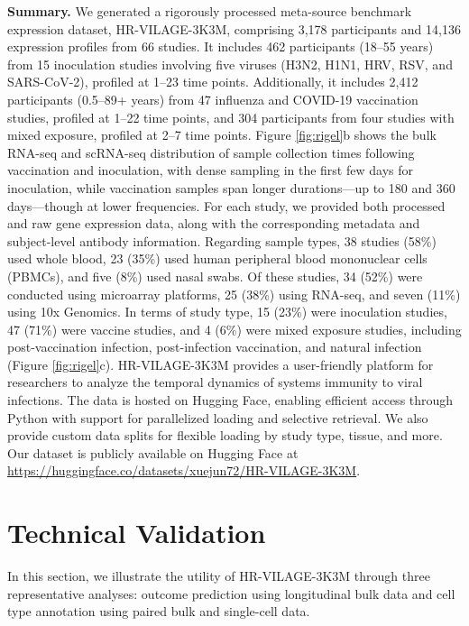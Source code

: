 \documentclass[
  12pt]{article}
\begin{document}
\noindent\textbf{Summary.}
We generated a rigorously processed meta-source benchmark expression dataset, HR-VILAGE-3K3M, comprising 3{,}178 participants and 14{,}136 expression profiles from 66 studies. It includes 462 participants (18–55 years) from 15 inoculation studies involving five viruses (H3N2, H1N1, HRV, RSV, and SARS-CoV-2), profiled at 1–23 time points. Additionally, it includes 2{,}412 participants (0.5–89+ years) from 47 influenza and COVID-19 vaccination studies, profiled at 1–22 time points, and 304 participants from four studies with mixed exposure, profiled at 2–7 time points. Figure \ref{fig:rigel}b shows the bulk RNA-seq and scRNA-seq distribution of sample collection times following vaccination and inoculation, with dense sampling in the first few days for inoculation, while vaccination samples span longer durations—up to 180 and 360 days—though at lower frequencies. For each study, we provided both processed and raw gene expression data, along with the corresponding metadata and subject-level antibody information. Regarding sample types, 38 studies (58\%) used whole blood, 23 (35\%) used human peripheral blood mononuclear cells (PBMCs), and five (8\%) used nasal swabs. Of these studies, 34 (52\%) were conducted using microarray platforms, 25 (38\%) using RNA-seq, and seven (11\%) using 10x Genomics. In terms of study type, 15 (23\%) were inoculation studies, 47 (71\%) were vaccine studies, and 4 (6\%) were mixed exposure studies, including post-vaccination infection, post-infection vaccination, and natural infection (Figure \ref{fig:rigel}c). HR-VILAGE-3K3M provides a user-friendly platform for researchers to analyze the temporal dynamics of systems immunity to viral infections. The data is hosted on Hugging Face, enabling efficient access through Python with support for parallelized loading and selective retrieval. We also provide custom data splits for flexible loading by study type, tissue, and more. Our dataset is publicly available on Hugging Face at \url{https://huggingface.co/datasets/xuejun72/HR-VILAGE-3K3M}.


\section{Technical Validation}
In this section, we illustrate the utility of HR-VILAGE-3K3M through three representative analyses: outcome prediction using longitudinal bulk data and cell type annotation using paired bulk and single-cell data. 
\end{document}
